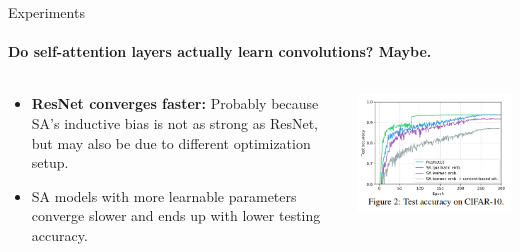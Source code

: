 \documentclass[9pt]{beamer}
\begin{document}
\begin{frame}{Experiments}
\framesubtitle{Do self-attention layers actually learn convolutions? Maybe.}
\begin{columns}
\begin{column}{0.43\textwidth}
  \begin{itemize}
    \item \textbf{ResNet converges faster:} Probably because SA's inductive bias is not as strong as ResNet, but may also be due to different optimization setup.
    
    \vspace{.1in}
    \item SA models with more learnable parameters converge slower and ends up with lower testing accuracy.  
  \end{itemize}
\end{column}
\begin{column}{0.55\textwidth} \centering
  \includegraphics[width=\textwidth]{presentation/images/converge_test_acc.png}
\end{column}
\end{columns}
\end{frame}
\end{document}
